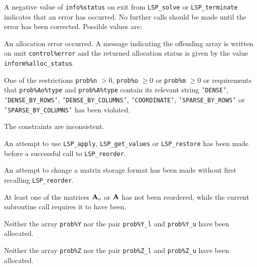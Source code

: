 \documentclass{galahad}
\newcommand{\packagename}{LSP}
\begin{document}
\galerrors
A negative value of {\tt info\%status} on exit from 
{\tt \packagename\_solve}
or 
{\tt \packagename\_terminate}
indicates that an error has occurred. No further calls should be made
until the error has been corrected. Possible values are:

\begin{description}

 An allocation error occurred. 
A message indicating the offending 
 array is written on unit {\tt control\%error} and the returned allocation 
 status is given by the value {\tt inform\%alloc\_status}.

 One of the restrictions 
{\tt prob\%n} $> 0$, {\tt prob\%o} $\geq  0$ or {\tt prob\%m} $\geq  0$
    or requirements that {\tt prob\%Ao\%type} 
    and {\tt prob\%A\%type} contain its relevant string
    {\tt 'DENSE'}, {\tt 'DENSE\_BY\_ROWS'}, {\tt 'DENSE\_BY\_COLUMNS'}, 
   {\tt 'COORDINATE'}, {\tt 'SPARSE\_BY\_ROWS'} or {\tt 'SPARSE\_BY\_COLUMNS'} 
    has been violated.


 The constraints are inconsistent.

 An attempt to use 
{\tt \packagename\_apply}, {\tt \packagename\_get\_values} 
or {\tt \packagename\_restore} 
has been made before a successful call to {\tt \packagename\_reorder}. 
 
 An attempt to change a matrix storage format has been made 
without first recalling {\tt \packagename\_reorder}. 
 
 At least one of the matrices ${\mathbf{A}}_o$ or ${\mathbf{A}}$ has not been reordered,
while the current subroutine call requires it to have been. 

 Neither the array {\tt prob\%Y} nor the pair {\tt prob\%Y\_l} and
{\tt prob\%Y\_u} have been allocated.

 Neither the array {\tt prob\%Z} nor the pair {\tt prob\%Z\_l} and
{\tt prob\%Z\_u} have been allocated.

\end{description}

\end{document}
